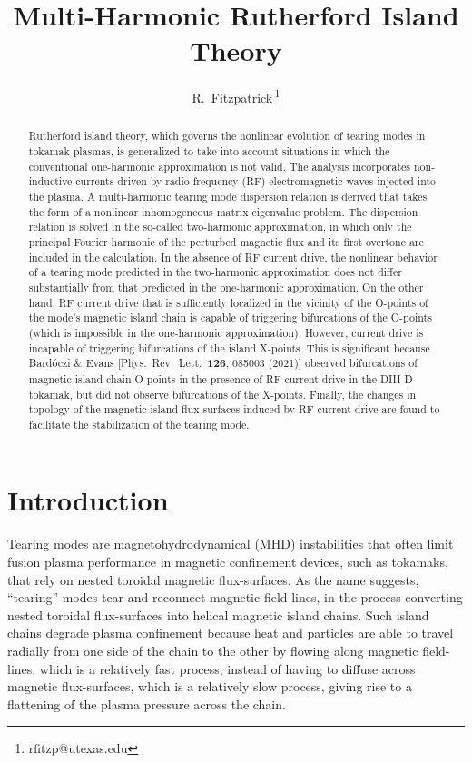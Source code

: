 \documentclass[12pt,prb,aps]{revtex4-1}
\begin{document}
\title{Multi-Harmonic Rutherford Island Theory}

\author{R.~Fitzpatrick\,\footnote{rfitzp@utexas.edu}}

\begin{abstract}
Rutherford island theory, which governs the nonlinear evolution of tearing modes in tokamak plasmas,  is generalized to take into account situations in which the conventional one-harmonic
approximation is not valid. The analysis incorporates  non-inductive currents driven by radio-frequency (RF) electromagnetic waves injected into the plasma. A
multi-harmonic tearing mode dispersion relation is derived that takes the form of a nonlinear inhomogeneous matrix
eigenvalue problem.   The  dispersion relation is solved in the so-called two-harmonic approximation,
in which  only the principal Fourier harmonic of the perturbed magnetic flux and its first overtone are included in the calculation.
In the absence of RF current drive, the nonlinear behavior of a tearing
mode predicted in the two-harmonic approximation does not differ substantially from that predicted in the
 one-harmonic approximation.  On the other hand, RF current drive that is sufficiently localized in the
vicinity of the O-points of the mode's magnetic island chain is capable of triggering  bifurcations of the O-points (which is impossible in the one-harmonic approximation). However, current
drive is incapable of triggering  bifurcations of the island X-points. This is significant because
 Bard\'{o}czi \& Evans [Phys.\ Rev.\ Lett.\ {\bf 126}, 085003 (2021)]  observed  bifurcations of magnetic island chain O-points in the presence of RF
 current drive in the DIII-D tokamak, but did not observe bifurcations of the X-points. Finally, the changes in topology of the magnetic island
 flux-surfaces induced by RF current drive are found to facilitate the stabilization of the tearing mode. 
\end{abstract}

\maketitle

\section{Introduction}
Tearing modes are magnetohydrodynamical  (MHD) instabilities that often limit fusion plasma performance in  magnetic confinement devices, such as tokamaks, that rely on nested toroidal
magnetic flux-surfaces.\cite{fkr,wesson} As the name suggests, ``tearing''
modes tear and reconnect magnetic field-lines, in the process
converting nested toroidal flux-surfaces into helical magnetic
island chains.\cite{ruth} Such island chains degrade plasma confinement because
heat and particles are able to travel radially from one side of
the chain to the other by flowing along magnetic field-lines,
which is a relatively fast process, instead of having to diffuse
across magnetic flux-surfaces, which is a relatively slow
process, giving rise to a flattening of the plasma pressure across the  chain.\cite{chang,fitz}
\end{document}
